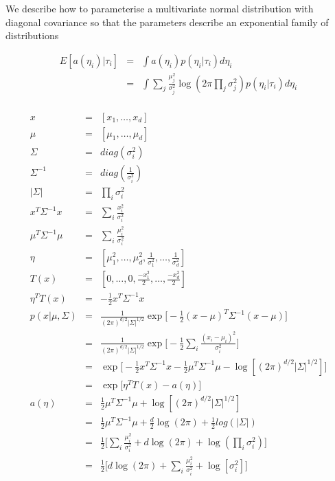\documentclass{article}
\begin{document}
We describe how to parameterise a multivariate normal distribution with diagonal covariance so that the parameters describe an exponential family of distributions

\begin{eqnarray*}
	E[a(\eta_{i})|\tau_{i}] 
& = &
	\int{
		a(\eta_{i})
		p(\eta_{i}|\tau_{i})
		d\eta_{i}
	} \\
& = &
	\int{
		\sum_{j}{ \frac{\mu_{j}^2}{\sigma_{j}^{2}} }
		\log(2 \pi \prod_{j}{ \sigma_{j}^{2} })
		p(\eta_{i}|\tau_{i})
		d\eta_{i}
	} \\
\end{eqnarray*}


\begin{eqnarray*}
x & = & [ x_{1}, \ldots, x_{d} ] \\
\mu & = & [ \mu_{1}, \ldots, \mu_{d} ] \\
\Sigma & = & diag(\sigma_{i}^{2}) \\
\Sigma^{-1} & = & diag(\frac{1}{\sigma_{i}^{2}}) \\
|\Sigma| & = & \prod_{i}{\sigma_{i}^{2}} \\
x^{T} \Sigma^{-1} x & = & \sum_{i}\frac{ x_{i}^{2} }{ \sigma_{i}^{2} } \\
\mu^{T} \Sigma^{-1} \mu & = & \sum_{i}\frac{ \mu_{i}^{2} }{ \sigma_{i}^{2} } \\
\eta & = & 
	[
		\mu_{1}^{2}, \ldots, \mu_{d}^{2}, 
		\frac{1}{\sigma_{1}^{2}}, \ldots, \frac{1}{\sigma_{d}^{2}}
	] \\
T(x) & = & 
	[ 0, \ldots, 0, \frac{-x_{1}^{2}}{2}, \ldots, \frac{-x_{d}^{2}}{2} ] \\
\eta^{T} T(x) & = & -\frac{1}{2}x^{T} \Sigma^{-1} x \\
p(x|\mu,\Sigma) & = & 
	\frac{ 1 }{ (2 \pi)^{d/2} |\Sigma|^{1/2} }
	\exp\big[
		-
		\frac{1}{2}
		(x-\mu)^{T}
		\Sigma^{-1}
		(x-\mu)
	\big] \\
 & = &
	\frac{ 1 }{ (2 \pi)^{d/2} |\Sigma|^{1/2} }
	\exp\big[
		-
		\frac{1}{2}
		\sum_{i}{
			\frac{(x_{i} - \mu_{i})^2}{\sigma_{i}^{2}}
		}
	\big] \\
 & = &
	\exp\big[
		-
		\frac{1}{2}
		x^{T}
		\Sigma^{-1}
		x
		-
		\frac{1}{2}
		\mu^{T}
		\Sigma^{-1}
		\mu
		-
		\log[ (2 \pi)^{d/2} |\Sigma|^{1/2} ]
	\big] \\
 & = & \exp\big[ \eta^{T} T(x) - a(\eta) \big] \\
a(\eta) & = &
	\frac{1}{2} \mu^{T} \Sigma^{-1} \mu
	+ \log[(2 \pi)^{d/2} |\Sigma|^{1/2}] \\                                
	& = &
	\frac{1}{2} \mu^{T} \Sigma^{-1} \mu
	+ \frac{d}{2}\log(2 \pi) 
	+ \frac{1}{2}log(|\Sigma|) \\
	& = &
	\frac{1}{2}\bigg[
		\sum_{i}\frac{ \mu_{i}^{2} }{ \sigma_{i}^{2} }
		+ d \log(2 \pi)
		+ \log(\prod_{i}{\sigma_{i}^{2}}) 
	\bigg] \\
	& = &
	\frac{1}{2}\bigg[
		d \log(2 \pi)
		+ \sum_{i}{\frac{ \mu_{i}^{2} }{ \sigma_{i}^{2} } + \log[\sigma_{i}^{2}]}
	\bigg] \\
\end{eqnarray*}
\end{document}
